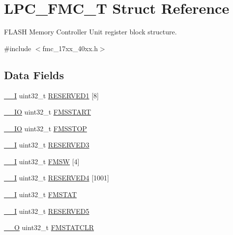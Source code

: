 \hypertarget{structLPC__FMC__T}{\section{L\-P\-C\-\_\-\-F\-M\-C\-\_\-\-T Struct Reference}
\label{structLPC__FMC__T}
}


F\-L\-A\-S\-H Memory Controller Unit register block structure.  




{\ttfamily \#include $<$fmc\-\_\-17xx\-\_\-40xx.\-h$>$}

\subsection*{Data Fields}
\begin{DoxyCompactItemize}
\item 
\hyperlink{core__cm3_8h_af63697ed9952cc71e1225efe205f6cd3}{\-\_\-\-\_\-\-I} uint32\-\_\-t \hyperlink{structLPC__FMC__T_a17b10ffb216f33f76e0984f1bb97c3dd}{R\-E\-S\-E\-R\-V\-E\-D1} \mbox{[}8\mbox{]}
\item 
\hyperlink{core__cm3_8h_aec43007d9998a0a0e01faede4133d6be}{\-\_\-\-\_\-\-I\-O} uint32\-\_\-t \hyperlink{structLPC__FMC__T_a9b3295a45c90bcabe879ace3d0de0ef8}{F\-M\-S\-S\-T\-A\-R\-T}
\item 
\hyperlink{core__cm3_8h_aec43007d9998a0a0e01faede4133d6be}{\-\_\-\-\_\-\-I\-O} uint32\-\_\-t \hyperlink{structLPC__FMC__T_a3d484fa5da4d1e27addf19ad43b338ac}{F\-M\-S\-S\-T\-O\-P}
\item 
\hyperlink{core__cm3_8h_af63697ed9952cc71e1225efe205f6cd3}{\-\_\-\-\_\-\-I} uint32\-\_\-t \hyperlink{structLPC__FMC__T_a75dead6dac33f1333655320d02576d6e}{R\-E\-S\-E\-R\-V\-E\-D3}
\item 
\hyperlink{core__cm3_8h_af63697ed9952cc71e1225efe205f6cd3}{\-\_\-\-\_\-\-I} uint32\-\_\-t \hyperlink{structLPC__FMC__T_a00273f3f32e8eeff8dd8e384ef2c8199}{F\-M\-S\-W} \mbox{[}4\mbox{]}
\item 
\hyperlink{core__cm3_8h_af63697ed9952cc71e1225efe205f6cd3}{\-\_\-\-\_\-\-I} uint32\-\_\-t \hyperlink{structLPC__FMC__T_a3562f9575288974c373fd78283ac56a1}{R\-E\-S\-E\-R\-V\-E\-D4} \mbox{[}1001\mbox{]}
\item 
\hyperlink{core__cm3_8h_af63697ed9952cc71e1225efe205f6cd3}{\-\_\-\-\_\-\-I} uint32\-\_\-t \hyperlink{structLPC__FMC__T_a0ecee36dd102cfd5d4eeb3113fbf508a}{F\-M\-S\-T\-A\-T}
\item 
\hyperlink{core__cm3_8h_af63697ed9952cc71e1225efe205f6cd3}{\-\_\-\-\_\-\-I} uint32\-\_\-t \hyperlink{structLPC__FMC__T_a374b0f7e9083f242ad88ed5e83202636}{R\-E\-S\-E\-R\-V\-E\-D5}
\item 
\hyperlink{core__cm3_8h_a7e25d9380f9ef903923964322e71f2f6}{\-\_\-\-\_\-\-O} uint32\-\_\-t \hyperlink{structLPC__FMC__T_a5cb3139486ee475934461686aa247ef5}{F\-M\-S\-T\-A\-T\-C\-L\-R}
\end{DoxyCompactItemize}


